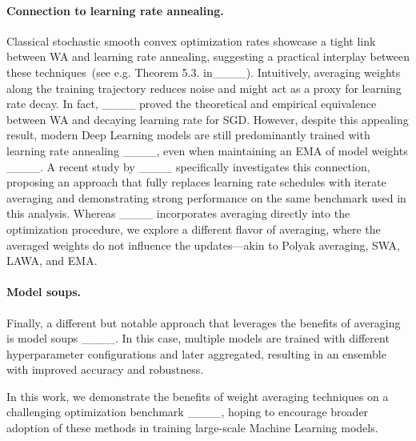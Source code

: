 \vspace{-2mm}
\paragraph{Connection to learning rate annealing.} 
Classical stochastic smooth convex optimization rates showcase a tight link between WA and learning rate annealing, suggesting a practical interplay between these techniques~(see e.g. Theorem 5.3. in____).
Intuitively, averaging weights along the training trajectory reduces noise and might act as a proxy for learning rate decay. In fact, ____ proved the theoretical and empirical equivalence between WA and decaying learning rate for SGD. 
However, despite this appealing result, 
modern Deep Learning models are still predominantly trained with learning rate annealing ____, even when maintaining an EMA of model weights ____. 
A recent study by ____ specifically investigates this connection, proposing an approach that fully replaces learning rate schedules with iterate averaging and demonstrating strong performance on the same benchmark used in this analysis.
Whereas ____ incorporates averaging directly into the optimization procedure, we explore a different flavor of averaging, where the averaged weights do not influence the updates—akin to Polyak averaging, SWA, LAWA, and EMA.

\vspace{-2mm}
\paragraph{Model soups.} Finally, a different but notable approach that leverages the benefits of averaging is model soups ____. In this case, multiple models are trained with different hyperparameter configurations and later aggregated, resulting in an ensemble with improved accuracy and robustness.

In this work, we demonstrate the benefits of weight averaging techniques on a challenging optimization benchmark ____, hoping to encourage broader adoption of these methods in training large-scale Machine Learning models.



